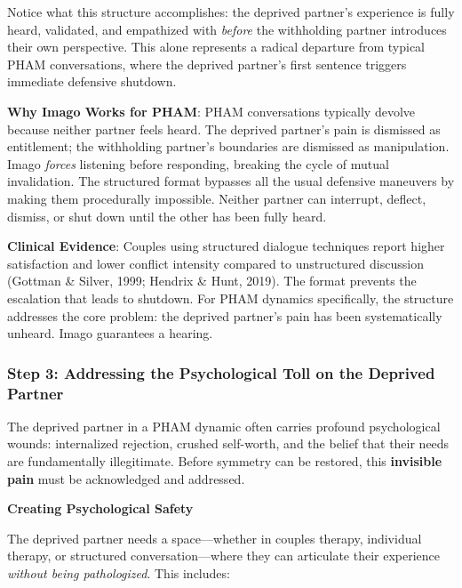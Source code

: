 \documentclass[12pt, letterpaper]{article}
\begin{document}
Notice what this structure accomplishes: the deprived partner's experience is fully heard, validated, and empathized with \textit{before} the withholding partner introduces their own perspective. This alone represents a radical departure from typical PHAM conversations, where the deprived partner's first sentence triggers immediate defensive shutdown.

\textbf{Why Imago Works for PHAM}: PHAM conversations typically devolve because neither partner feels heard. The deprived partner's pain is dismissed as entitlement; the withholding partner's boundaries are dismissed as manipulation. Imago \textit{forces} listening before responding, breaking the cycle of mutual invalidation. The structured format bypasses all the usual defensive maneuvers by making them procedurally impossible. Neither partner can interrupt, deflect, dismiss, or shut down until the other has been fully heard.

\textbf{Clinical Evidence}: Couples using structured dialogue techniques report higher satisfaction and lower conflict intensity compared to unstructured discussion (Gottman \& Silver, 1999; Hendrix \& Hunt, 2019). The format prevents the escalation that leads to shutdown. For PHAM dynamics specifically, the structure addresses the core problem: the deprived partner's pain has been systematically unheard. Imago guarantees a hearing.

\subsubsection{Step 3: Addressing the Psychological Toll on the Deprived Partner}

The deprived partner in a PHAM dynamic often carries profound psychological wounds: internalized rejection, crushed self-worth, and the belief that their needs are fundamentally illegitimate. Before symmetry can be restored, this \textbf{invisible pain} must be acknowledged and addressed.

\textbf{Creating Psychological Safety}

The deprived partner needs a space---whether in couples therapy, individual therapy, or structured conversation---where they can articulate their experience \textit{without being pathologized}. This includes:
\end{document}
